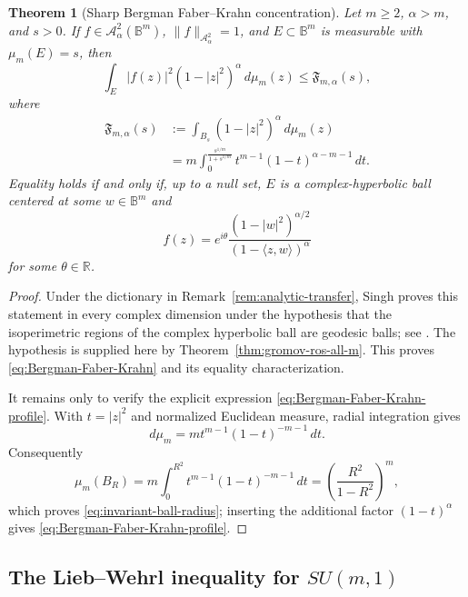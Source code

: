 \documentclass[11pt,reqno]{amsart}
\numberwithin{equation}{section}
\newtheorem{theorem}{Theorem}[section]
\theoremstyle{definition}
\theoremstyle{remark}
\begin{document}
\begin{theorem}[Sharp Bergman Faber--Krahn concentration]
\label{thm:Bergman-Faber-Krahn}
Let $m\ge2$, $\alpha>m$, and $s>0$.  If
$f\in\mathcal A^2_\alpha(\mathbb B^m)$,
$\|f\|_{\mathcal A^2_\alpha}=1$, and $E\subset\mathbb B^m$ is measurable
with $\mu_m(E)=s$, then
\begin{equation}
 \int_E |f(z)|^2(1-|z|^2)^\alpha\,d\mu_m(z)
 \le
 \mathfrak F_{m,\alpha}(s),
 \label{eq:Bergman-Faber-Krahn}
\end{equation}
where
\begin{equation}
 \begin{aligned}
 \mathfrak F_{m,\alpha}(s)
 &:=\int_{B_s}(1-|z|^2)^\alpha\,d\mu_m(z)\\
 &=m\int_0^{\frac{s^{1/m}}{1+s^{1/m}}}
 t^{m-1}(1-t)^{\alpha-m-1}\,dt.
 \end{aligned}
 \label{eq:Bergman-Faber-Krahn-profile}
\end{equation}
Equality holds if and only if, up to a null set, $E$ is a complex-hyperbolic
ball centered at some $w\in\mathbb B^m$ and
\[
 f(z)=e^{i\theta}
 \frac{(1-|w|^2)^{\alpha/2}}{(1-\langle z,w\rangle)^\alpha}
\]
for some $\theta\in\mathbb R$.
\end{theorem}

\begin{proof}
Under the dictionary in Remark~\ref{rem:analytic-transfer}, Singh proves
this statement in every complex dimension under the hypothesis
that the isoperimetric regions of the complex hyperbolic ball are geodesic
balls; see \cite[Theorem~C]{Singh2026}.  The hypothesis is supplied here by
Theorem~\ref{thm:gromov-ros-all-m}. This proves
\eqref{eq:Bergman-Faber-Krahn} and its equality characterization.

It remains only to verify the explicit expression
\eqref{eq:Bergman-Faber-Krahn-profile}.  With $t=|z|^2$ and normalized
Euclidean measure, radial integration gives
\[
 d\mu_m=m t^{m-1}(1-t)^{-m-1}\,dt.
\]
Consequently
\[
 \mu_m(B_R)=m\int_0^{R^2}t^{m-1}(1-t)^{-m-1}\,dt
 =\left(\frac{R^2}{1-R^2}\right)^m,
\]
which proves \eqref{eq:invariant-ball-radius}; inserting the additional
factor $(1-t)^\alpha$ gives
\eqref{eq:Bergman-Faber-Krahn-profile}.
\end{proof}

\subsection{The Lieb--Wehrl inequality for
\texorpdfstring{$SU(m,1)$}{SU(m,1)}}
\end{document}
